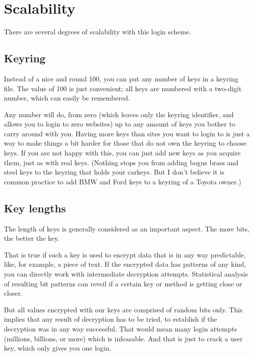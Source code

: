 \section{Scalability}
There are several degrees of scalability with this login scheme.

\subsection{Keyring}
Instead of a nice and round 100,
you can put any number of keys in a keyring file.
The value of 100 is just convenient;
all keys are numbered with a two-digit number,
which can easily be remembered.
\par
Any number will do,
from zero
(which leaves only the keyring identifier,
and allows you to login to zero websites)
up to any amount of keys you bother to carry around with you.
Having more keys than sites you want to login to is just a way to make things a bit harder for those that do not own the keyring to choose keys.
If you are not happy with this,
you can just add new keys as you acquire them,
just as with real keys.
(Nothing stops you from adding bogus brass and steel keys to the keyring that holds your carkeys.
But I don't believe it is common practice to add BMW and Ford keys to a keyring of a Toyota owner.)

\subsection{Key lengths}
\label{sec:key_length}
The length of keys is generally considered as an important aspect.
The more bits, the better the key.
\par
That is true if such a key is used to encrypt data that is in any way predictable,
like, for example, a piece of text.
If the encrypted data has patterns of any kind,
you can directly work with intermediate decryption attempts.
Statistical analysis of resulting bit patterns can reveil if a certain key or method is getting close or closer.
\par
But all values encrypted with our keys are comprised of random bits only.
This implies that any result of decryption has to be tried,
to establish if the decryption was in any way successful.
That would mean many login attempts
(millions, billions, or more)
which is infeasable.
And that is just to crack a user key,
which only gives you one login.

